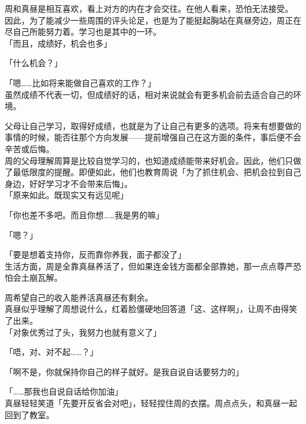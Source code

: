 周和真昼是相互喜欢，看上对方的内在才会交往。在他人看来，恐怕无法接受。\\

因此，为了能减少一些周围的评头论足，也是为了能挺起胸站在真昼旁边，周正在尽自己所能努力着。学习也是其中的一环。\\

「而且，成绩好，机会也多」

「什么机会？」

「嗯……比如将来能做自己喜欢的工作？」\\

虽然成绩不代表一切，但成绩好的话，相对来说就会有更多机会前去适合自己的环境。

父母让自己学习，取得好成绩，也就是为了让自己有更多的选项。将来有想要做的事情的时候，能否往那个方向发展——提前增强自己在这方面的条件，事后便不会辛苦或后悔。\\

周的父母理解周算是比较自觉学习的，也知道成绩能带来好机会。因此，他们只做了最低限度的提醒。即便如此，他们也教育周说「为了抓住机会、把机会拉到自己身边，好好学习才不会带来后悔」。\\

「原来如此。既现实又有远见呢」

「你也差不多吧。而且你想……我是男的嘛」

「嗯？」

「要是想着支持你，反而靠你养我，面子都没了」\\

生活方面，周是全靠真昼养活了，但如果连金钱方面都全部靠她，那一点点尊严恐怕会土崩瓦解。

周希望自己的收入能养活真昼还有剩余。\\

真昼似乎理解了周想说什么，红着脸僵硬地回答道「这、这样啊」，让周不由得笑了出来。\\

「对象优秀过了头，我努力也就有意义了」

「唔，对、对不起……？」

「啊不是，你就保持你自己的样子就好。是我自说自话要努力的」

「……那我也自说自话给你加油」\\

真昼轻轻笑道「先要开反省会对吧」，轻轻捏住周的衣摆。周点点头，和真昼一起回到了教室。
